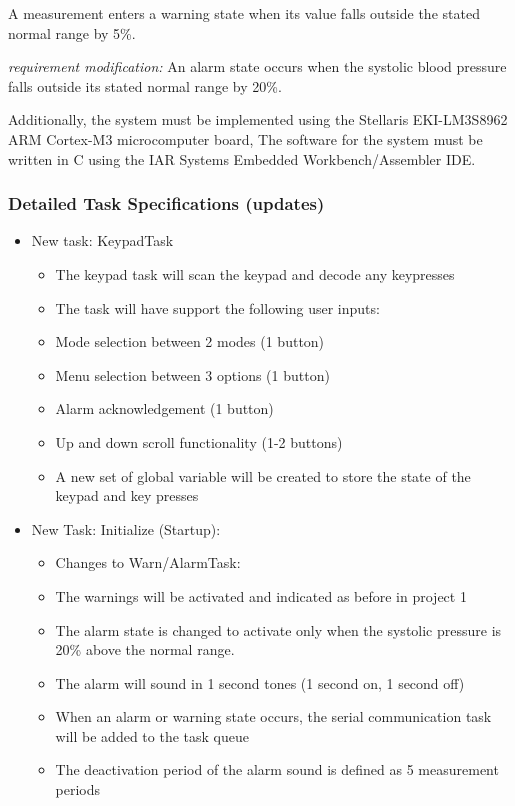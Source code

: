 \documentclass[12pt]{article} %
\begin{document}
A measurement enters a warning state when its value falls outside the stated 
normal range by 5\%. 

\emph{requirement modification: }An alarm state occurs when the systolic blood
pressure falls outside
its stated normal range by 20\%.	

Additionally, the system must be implemented using the Stellaris 
EKI-LM3S8962 ARM Cortex-M3 microcomputer board, The software for the system 
must be written in C using the IAR Systems Embedded Workbench/Assembler IDE.

\subsubsection{Detailed Task Specifications (updates)}

\begin{itemize}
  \item New task: KeypadTask
    \begin{itemize}
      \item The keypad task will scan the keypad and decode any keypresses
      \item The task will have support the following user inputs:
      \item Mode selection between 2 modes (1 button)
      \item Menu selection between 3 options (1 button)
      \item Alarm acknowledgement (1 button)
      \item Up and down scroll functionality (1-2 buttons)
      \item A new set of global variable will be created to store the state of the keypad and key presses
    \end{itemize}

  \item New Task: Initialize (Startup):
    \begin{itemize}
      \item Changes to Warn/AlarmTask:
      \item The warnings will be activated and indicated as before in project 1
      \item The alarm state is changed to activate only when the systolic
	pressure is 20\% above the normal range.
      \item The alarm will sound in 1 second tones (1 second on, 1 second off)
      \item When an alarm or warning state occurs, the serial communication
	task will be added to the task queue
      \item The deactivation period of the alarm sound is defined as 5
	measurement periods
    \end{itemize}


\end{itemize}
\end{document}
